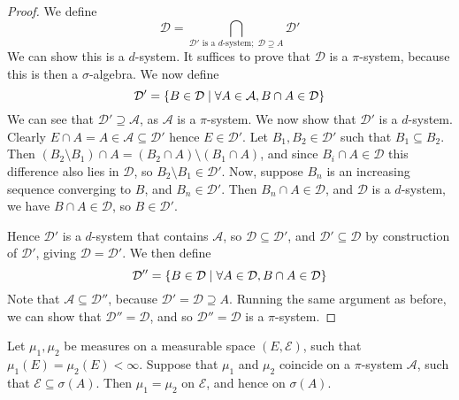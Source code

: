 \begin{proof}
	We define
	\[ \mathcal D = \bigcap_{\mathcal D' \text{ is a } d \text{-system};\; \mathcal D \supseteq A} \mathcal D' \]
	We can show this is a \( d \)-system.
	It suffices to prove that \( \mathcal D \) is a \( \pi \)-system, because this is then a \( \sigma \)-algebra.
	We now define
	\[ \mathcal D' = \qty{B \in \mathcal D \mid \forall A \in \mathcal A, B \cap A \in \mathcal D} \]
	We can see that \( \mathcal D' \supseteq \mathcal A \), as \( \mathcal A \) is a \( \pi \)-system.
	We now show that \( \mathcal D' \) is a \( d \)-system.
	Clearly \( E \cap A = A \in \mathcal A \subseteq \mathcal D' \) hence \( E \in \mathcal D' \).
	Let \( B_1, B_2 \in \mathcal D' \) such that \( B_1 \subseteq B_2 \).
	Then \( (B_2 \setminus B_1) \cap A = (B_2 \cap A) \setminus (B_1 \cap A) \), and since \( B_i \cap A \in \mathcal D \) this difference also lies in \( \mathcal D \), so \( B_2 \setminus B_1 \in \mathcal D' \).
	Now, suppose \( B_n \) is an increasing sequence converging to \( B \), and \( B_n \in \mathcal D' \).
	Then \( B_n \cap A \in \mathcal D \), and \( \mathcal D \) is a \( d \)-system, we have \( B \cap A \in \mathcal D \), so \( B \in \mathcal D' \).

	Hence \( \mathcal D' \) is a \( d \)-system that contains \( \mathcal A \), so \( \mathcal D \subseteq \mathcal D' \), and \( \mathcal D' \subseteq \mathcal D \) by construction of \( \mathcal D' \), giving \( \mathcal D = \mathcal D' \).
	We then define
	\[ \mathcal D'' = \qty{B \in \mathcal D \mid \forall A \in \mathcal D, B \cap A \in \mathcal D} \]
	Note that \( \mathcal A \subseteq \mathcal D'' \), because \( \mathcal D' = \mathcal D \supseteq A \).
	Running the same argument as before, we can show that \( \mathcal D'' = \mathcal D \), and so \( \mathcal D'' = \mathcal D \) is a \( \pi \)-system.
\end{proof}
\begin{theorem}
	Let \( \mu_1, \mu_2 \) be measures on a measurable space \( (E, \mathcal E) \), such that \( \mu_1(E) = \mu_2(E) < \infty \).
	Suppose that \( \mu_1 \) and \( \mu_2 \) coincide on a \( \pi \)-system \( \mathcal A \), such that \( \mathcal E \subseteq \sigma(A) \).
	Then \( \mu_1 = \mu_2 \) on \( \mathcal E \), and hence on \( \sigma(A) \).
\end{theorem}
